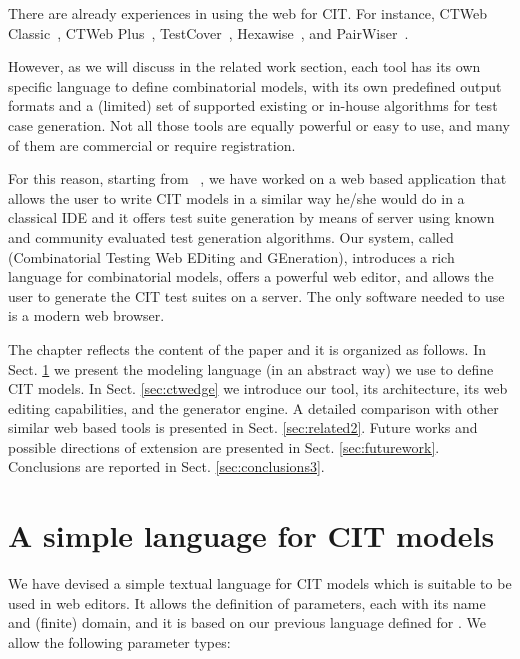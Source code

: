 \begin{tikzborder}{\cite{Gargantini16:validation}}
\begin{tikzborder}{\cite{gargantini_combinatorial_2017}}
\begin{tikzborder}{\cite{garn2019}}
\begin{tikzborder}{\cite{arcaini2019achieving}}
There are already experiences in using the web for CIT. For instance, CTWeb Classic~\cite{usaolaframework}, CTWeb Plus~\cite{ctwebplus}, TestCover~\cite{testcover}, Hexawise~\cite{hexawise}, and PairWiser~\cite{pairwiser}. 

However, as we will discuss in the related work section, each tool has its own specific language to define combinatorial models, with its own predefined output formats and a (limited) set of supported existing or in-house algorithms for test case generation. Not all those tools are equally powerful or easy to use, and many of them are commercial or require registration.

For this reason, starting from \citlab~\cite{citlab12}, we have worked on a web based application that allows the user to write CIT models in a similar way he/she would do in a classical IDE and it offers test suite generation by means of   server using known and community evaluated test generation algorithms. 
Our system, called \ctwedge (Combinatorial Testing Web EDiting and GEneration), introduces a rich language for combinatorial models, offers a powerful web editor, and allows the user to generate the CIT test suites on a server. The only software needed to use \ctwedge is a modern web browser.

The chapter reflects the content of the paper \cite{IWCTGargantini2018} and it is organized as follows. In Sect. \ref{sec:language} we present the modeling language (in an abstract way) we use to define CIT models. In Sect. \ref{sec:ctwedge} we introduce our tool, its architecture, its web editing capabilities, and the generator engine. A detailed comparison with other similar web based tools is presented in  Sect. \ref{sec:related2}. Future works and possible directions of extension are presented in Sect. \ref{sec:futurework}. Conclusions are reported in Sect. \ref{sec:conclusions3}.

\section{A simple language for CIT models}\label{sec:language}

\begin{tikzborder}{\cite{IWCTGargantini2018}}
We have devised a simple textual language for CIT models which is suitable to be used in web editors. It allows the definition of parameters, each with its name and (finite) domain, and it is based on our previous language defined for \citlab \cite{citlab12}. We allow the following parameter types: 


\end{tikzborder}
\end{tikzborder}
\end{tikzborder}
\end{tikzborder}
\end{tikzborder}
